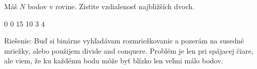 
Máš $N$ bodov v rovine. Zistite vzdialenosť najbližších
dvoch.

0 0
15 10
3 4
\koniec

Riešenie: Buď si binárne vyhľadávam rozmriežkovanie a pozerám
na susedné mriežky, alebo použijem divide and conquere. Problém
je len pri spájacej čiare, ale viem, že ku každému bodu môže
byť blízko len veľmi málo bodov.
